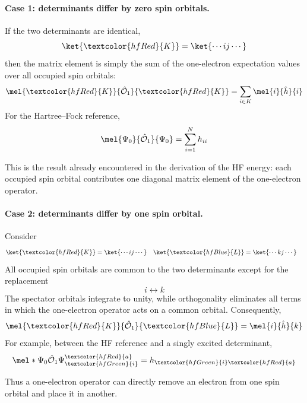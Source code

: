 \documentclass[11pt,a4paper,titlepage]{article}
\numberwithin{equation}{section}
\newcommand{\hh}{\Hat{h}}
\newcommand{\chO}{\Hat{\mathcal{O}}}
\newcommand{\red}[1]{\textcolor{hfRed}{#1}}
\newcommand{\green}[1]{\textcolor{hfGreen}{#1}}
\newcommand{\blue}[1]{\textcolor{hfBlue}{#1}}
\begin{document}
\paragraph{Case 1: determinants differ by zero spin orbitals.}

If the two determinants are identical,
\begin{equation}
  \ket{\red{K}}
  =
  \ket{\cdots i j\cdots}
\end{equation}
then the matrix element is simply the sum of the one-electron expectation
values over all occupied spin orbitals:
\begin{equation}
  \mel{\red{K}}{\chO_1}{\red{K}}
  =
  \sum_{i\in K}\mel{i}{\hh}{i}
  \label{eq:sc-one-zero}
\end{equation}
For the Hartree--Fock reference,
\begin{equation}
  \mel{\Psi_0}{\chO_1}{\Psi_0}
  =
  \sum_{i=1}^{N}h_{ii}
\end{equation}

This is the result already encountered in the derivation of the HF energy:
each occupied spin orbital contributes one diagonal matrix element of the
one-electron operator.

\paragraph{Case 2: determinants differ by one spin orbital.}

Consider
\begin{align}
  \ket{\red{K}}
  &=
  \ket{\cdots i j\cdots}
  &
  \ket{\blue{L}}
  &=
  \ket{\cdots k j\cdots}
\end{align}
All occupied spin orbitals are common to the two determinants except for the
replacement
\begin{equation}
  i\longleftrightarrow k
\end{equation}
The spectator orbitals integrate to unity, while orthogonality eliminates
all terms in which the one-electron operator acts on a common orbital.
Consequently,
\begin{equation}
  \mel{\red{K}}{\chO_1}{\blue{L}}
  =
  \mel{i}{\hh}{k}
  \label{eq:sc-one-one}
\end{equation}
For example, between the HF reference and a singly excited determinant,
\begin{equation}
  \mel*{\Psi_0}{\chO_1}{\Psi_{\green{i}}^{\red{a}}}
  =
  h_{\green{i}\red{a}}
\end{equation}

Thus a one-electron operator can directly remove an electron from one spin
orbital and place it in another.
\end{document}
